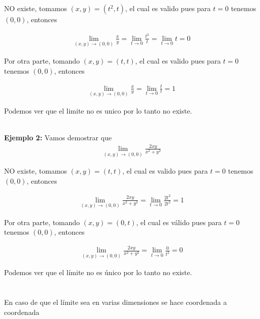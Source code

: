 \documentclass{article}
\theoremstyle{definition}
\begin{document}
NO existe, tomamos $(x,y) = (t^2,t)$, el cual es valido pues para $t=0$ tenemos $(0,0)$, entonces


\begin{align*}
\displaystyle \lim_{(x,y) \to (0,0)}  \frac{x}{y} = \lim_{t \to 0}  \frac{t^2}{t}  = \lim_{t \to 0}  t = 0  
\end{align*}


Por otra parte, tomando $(x,y) = (t,t)$, el cual es valido pues para $t=0$ tenemos $(0,0)$, entonces





\begin{align*}
\displaystyle \lim_{(x,y) \to (0,0)}  \frac{x}{y} = \lim_{t \to 0}  \frac{t}{t}  = 1  
\end{align*}

Podemos ver que el limite no es unico por lo tanto no existe.  \\ \\



\newpage


\textbf{Ejemplo 2: } Vamos demostrar que \\


\begin{align*}
\displaystyle \lim_{(x,y) \to (0,0)}  \frac{2xy}{x^2+y^2} 
\end{align*}

NO existe, tomamos $(x,y) = (t,t)$, el cual es valido pues para $t=0$ tenemos $(0,0)$, entonces


\begin{align*}
\displaystyle \lim_{(x,y) \to (0,0)}  \frac{2xy}{x^2+y^2} = \lim_{t \to 0}  \frac{2t^2}{2t^2}  = 1  
\end{align*}


Por otra parte, tomando $(x,y) = (0,t)$, el cual es v\'alido pues para $t=0$ tenemos $(0,0)$, entonces 



\begin{align*}
\displaystyle \lim_{(x,y) \to (0,0)}  \frac{2xy}{x^2+y^2}  = \lim_{t \to 0}  \frac{0}{t^2}   = 0  
\end{align*}

Podemos ver que el l\'imite no es \'unico por lo tanto no existe. \\ \\ \\


En caso de que el l\'imite sea en varias dimensiones se hace coordenada a coordenada \\
\end{document}
